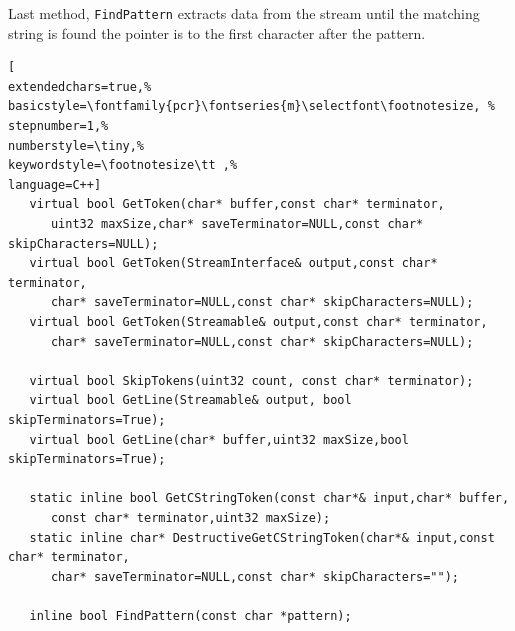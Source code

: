 Last method, \texttt{FindPattern} extracts data from the stream until the matching string is found the pointer is to the first character after the pattern.
\begin{lstlisting}[
extendedchars=true,%
basicstyle=\fontfamily{pcr}\fontseries{m}\selectfont\footnotesize, %
stepnumber=1,%
numberstyle=\tiny,%
keywordstyle=\footnotesize\tt ,%
language=C++]
   virtual bool GetToken(char* buffer,const char* terminator,
      uint32 maxSize,char* saveTerminator=NULL,const char* skipCharacters=NULL);
   virtual bool GetToken(StreamInterface& output,const char* terminator,
      char* saveTerminator=NULL,const char* skipCharacters=NULL);
   virtual bool GetToken(Streamable& output,const char* terminator,
      char* saveTerminator=NULL,const char* skipCharacters=NULL);

   virtual bool SkipTokens(uint32 count, const char* terminator);
   virtual bool GetLine(Streamable& output, bool skipTerminators=True);
   virtual bool GetLine(char* buffer,uint32 maxSize,bool skipTerminators=True);

   static inline bool GetCStringToken(const char*& input,char* buffer,
      const char* terminator,uint32 maxSize);
   static inline char* DestructiveGetCStringToken(char*& input,const char* terminator,
      char* saveTerminator=NULL,const char* skipCharacters="");

   inline bool FindPattern(const char *pattern);
\end{lstlisting}



